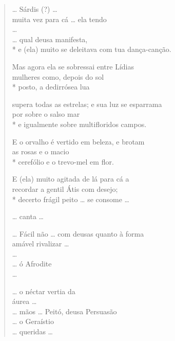 {\begin{verse}
\ldots{} Sárdis (?) \ldots{}\\
muita vez para cá \ldots{} ela tendo\\
\ldots{}\\
\ldots{} qual deusa manifesta,\\*
e (ela) muito se deleitava com tua dança-canção.

Mas agora ela se sobressai entre Lídias\\
mulheres como, depois do sol\\*
posto, a dedirrósea lua

supera todas as estrelas; e sua luz se esparrama\\
por sobre o salso mar \\*
e igualmente sobre multifloridos campos.

E o orvalho é vertido em beleza, e brotam\\
as rosas e o macio \\*
cerefólio e o trevo-mel em flor.

E (ela) muito agitada de lá para cá a \\
recordar a gentil Átis com desejo;\\*
decerto frágil peito \ldots{} se consome \ldots{}

\ldots{} canta \ldots{}

\ldots{} Fácil não \ldots{} com deusas quanto à forma\\
amável rivalizar \ldots{}\\
\ldots{}\\
\ldots{} ó Afrodite\\
\ldots{}

\ldots{} o néctar vertia da\\
áurea \ldots{}\\
\ldots{} mãos \ldots{} Peitó, deusa Persuasão\\
\ldots{} o Geraístio\\
\ldots{} queridas \ldots{}
\end{verse}

}
